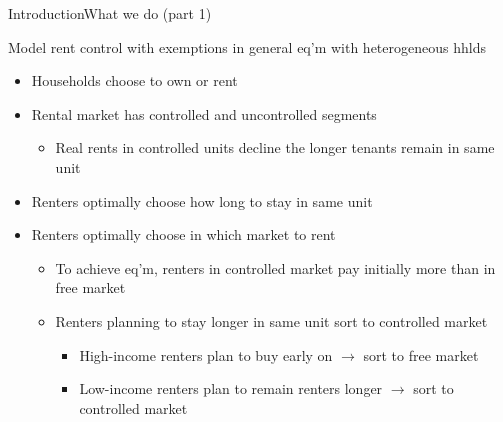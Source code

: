 \documentclass[11pt,aspectratio=169]{beamer}
\begin{document}
\begin{frame}{Introduction}{What we do (part 1)}

Model rent control with exemptions in general eq'm with heterogeneous hhlds

\begin{itemize}
    \item Households choose to own or rent
    \item Rental market has controlled and uncontrolled segments
    \begin{itemize}
        \item Real rents in controlled units decline the longer tenants remain in same unit  
    \end{itemize}
    \item Renters optimally choose how long to stay in same unit
    \item Renters optimally choose in which market to rent
    \begin{itemize}
        \item To achieve eq'm, renters in controlled market pay initially more than in free market
        \item Renters planning to stay longer in same unit sort to controlled market
        \begin{itemize}
            \item High-income renters plan to buy early on $\rightarrow$ sort to free market
            \item Low-income renters plan to remain renters longer $\rightarrow$ sort to controlled market
        \end{itemize}
    \end{itemize}
\end{itemize}

\end{frame}
\end{document}
